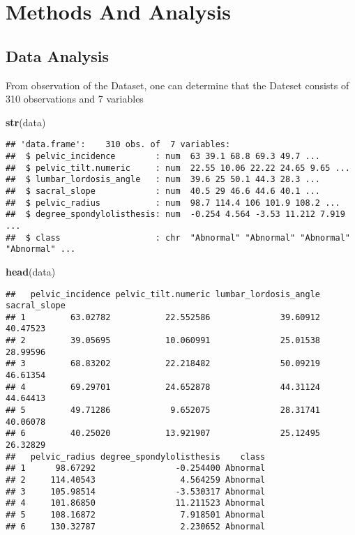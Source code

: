 \documentclass[
]{article}
\newenvironment{Shaded}{\begin{snugshade}}{\end{snugshade}}
\newcommand{\KeywordTok}[1]{\textcolor[rgb]{0.13,0.29,0.53}{\textbf{#1}}}
\newcommand{\NormalTok}[1]{#1}
\begin{document}
\newpage

\hypertarget{methods-and-analysis}{%
\section{Methods And Analysis}\label{methods-and-analysis}}

\hypertarget{data-analysis}{%
\subsection{Data Analysis}\label{data-analysis}}

From observation of the Dataset, one can determine that the Dateset
consists of 310 observations and 7 variables

\begin{Shaded}
\begin{Highlighting}[]
\KeywordTok{str}\NormalTok{(data)}
\end{Highlighting}
\end{Shaded}

\begin{verbatim}
## 'data.frame':    310 obs. of  7 variables:
##  $ pelvic_incidence        : num  63 39.1 68.8 69.3 49.7 ...
##  $ pelvic_tilt.numeric     : num  22.55 10.06 22.22 24.65 9.65 ...
##  $ lumbar_lordosis_angle   : num  39.6 25 50.1 44.3 28.3 ...
##  $ sacral_slope            : num  40.5 29 46.6 44.6 40.1 ...
##  $ pelvic_radius           : num  98.7 114.4 106 101.9 108.2 ...
##  $ degree_spondylolisthesis: num  -0.254 4.564 -3.53 11.212 7.919 ...
##  $ class                   : chr  "Abnormal" "Abnormal" "Abnormal" "Abnormal" ...
\end{verbatim}

\begin{Shaded}
\begin{Highlighting}[]
\KeywordTok{head}\NormalTok{(data)}
\end{Highlighting}
\end{Shaded}

\begin{verbatim}
##   pelvic_incidence pelvic_tilt.numeric lumbar_lordosis_angle sacral_slope
## 1         63.02782           22.552586              39.60912     40.47523
## 2         39.05695           10.060991              25.01538     28.99596
## 3         68.83202           22.218482              50.09219     46.61354
## 4         69.29701           24.652878              44.31124     44.64413
## 5         49.71286            9.652075              28.31741     40.06078
## 6         40.25020           13.921907              25.12495     26.32829
##   pelvic_radius degree_spondylolisthesis    class
## 1      98.67292                -0.254400 Abnormal
## 2     114.40543                 4.564259 Abnormal
## 3     105.98514                -3.530317 Abnormal
## 4     101.86850                11.211523 Abnormal
## 5     108.16872                 7.918501 Abnormal
## 6     130.32787                 2.230652 Abnormal
\end{verbatim}
\end{document}
